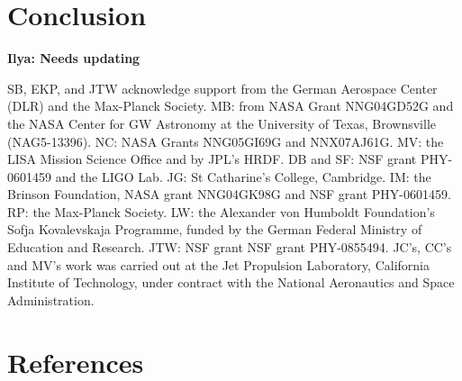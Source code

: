 \documentclass{iopart}
\newcommand{\ilya}[1]{{\color{red} \bf Ilya: #1}}
\begin{document}
\section{Conclusion}

\ack

\ilya{Needs updating}

SB, EKP, and JTW acknowledge support from the German Aerospace Center (DLR) and the Max-Planck Society.
MB: from NASA Grant NNG04GD52G and the NASA Center for GW Astronomy at the University of Texas, Brownsville (NAG5-13396). 
NC: NASA Grants NNG05GI69G and NNX07AJ61G.
MV: the LISA Mission Science Office and by JPL's HRDF.
DB and SF: NSF grant PHY-0601459 and the LIGO Lab.
JG: St Catharine's College, Cambridge.
IM: the Brinson Foundation, NASA grant NNG04GK98G and NSF grant PHY-0601459.
RP: the Max-Planck Society.
LW: the Alexander von Humboldt Foundation's Sofja Kovalevskaja Programme, funded by the German Federal Ministry of Education and Research.
JTW: NSF grant NSF grant PHY-0855494.
JC's, CC's and MV's work was carried out at the Jet Propulsion Laboratory, California Institute of Technology, under contract with the National Aeronautics and Space Administration.

\section*{References}
\end{document}
